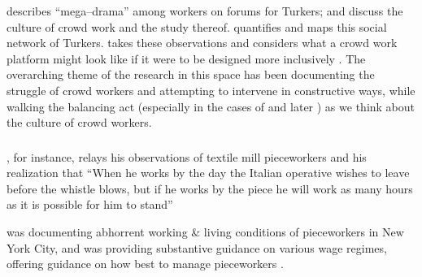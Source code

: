 \documentclass[trackingWork]{subfiles}
\begin{document}
\citeauthor{dynamo} describes ``mega--drama'' among workers on forums for Turkers;
\citeauthor{irani2015cultural} and \citeauthor{storiesIraniSilberman} discuss
the culture of crowd work and the study thereof.
\citeauthor{crowdcollab} quantifies and maps this social network of Turkers.
\citeauthor{takingAHITMcInnis} takes these observations and considers
what a crowd work platform might look like if it were to be designed more inclusively
\cite{dynamo,irani2015cultural,storiesIraniSilberman,crowdcollab,takingAHITMcInnis}.
The overarching theme of the research in this space has been
documenting the struggle of crowd workers
and attempting to intervene in constructive ways, while walking the balancing act
(especially in the cases of \citeauthor{irani2015cultural} and later \citeauthor{storiesIraniSilberman})
as we think about the culture of crowd workers.



\subsubsection{\pieceworkpers}
\citeauthor{clark1908cotton}, for instance,
relays his observations of textile mill pieceworkers and his realization that
``When he works by the day the Italian operative wishes to leave before the whistle blows,
but if he works by the piece he will work as many hours as it is possible for him to stand''

\citeauthor{riisOtherSideLives} was documenting abhorrent working \& living conditions of pieceworkers in New York City,
and \citeauthor{norton1900textile} was providing substantive guidance on various wage regimes,
offering guidance on how best to manage pieceworkers
\cite{riisOtherSideLives,norton1900textile}.
\end{document}
